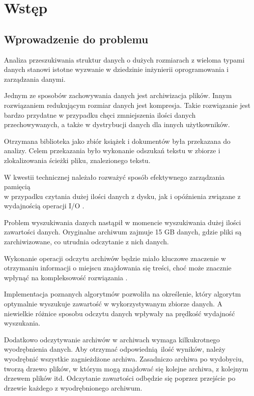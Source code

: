 \chapter{Wstęp}

\section{Wprowadzenie do problemu}
Analiza przeszukiwania struktur danych o dużych rozmiarach z wieloma typami danych stanowi
istotne wyzwanie w dziedzinie inżynierii oprogramowania i zarządzania danymi. 

Jednym ze sposobów zachowywania danych jest archiwizacja plików. Innym 
rozwiązaniem redukującym rozmiar danych jest kompresja. Takie rozwiązanie jest
bardzo przydatne w przypadku chęci
zmniejszenia ilości danych przechowywanych, a także w dystrybucji danych dla
innych użytkowników.

Otrzymana biblioteka jako zbiór książek i dokumentów była przekazana do analizy.
Celem przekazania było wykonanie odszukań tekstu w zbiorze i zlokalizowania
ścieżki pliku, znalezionego tekstu.

W kwestii technicznej należało rozważyć sposób efektywnego zarządzania pamięcią \\
w przypadku czytania dużej ilości danych z dysku, jak i opóźnienia związane z 
wydajnością operacji I/O \cite{bib:internet:UrzadzeniaWejsciaWyjscia}.

Problem wyszukiwania danych nastąpił w momencie wyszukiwania dużej ilości 
zawartości danych. Oryginalne archiwum zajmuje 15 GB danych, gdzie pliki są 
zarchiwizowane, co utrudnia odczytanie z nich danych. 

Wykonanie operacji odczytu archiwów będzie miało kluczowe znaczenie w 
otrzymaniu informacji o miejscu znajdowania się treści, choć może znacznie 
wpłynąć na kompleksowość rozwiązania \cite{bib:ksiazka:kompleksowośćArchiwów}.

Implementacja poznanych algorytmów pozwoliła na określenie, który algorytm 
optymalnie wyszukuje zawartość w wykorzystywanym zbiorze danych. A niewielkie
różnice sposobu odczytu danych wpływały na prędkość wydajność wyszukania.

Dodatkowo odczytywanie archiwów w archiwach wymaga kilkukrotnego wyodrębnienia
danych. Aby otrzymać odpowiednią ilość wyników, należy wyodrębnić 
wszystkie zagnieżdżone archiwa. Zasadniczo archiwa po wydobyciu,
tworzą drzewo plików, w którym mogą znajdować się kolejne archiwa, z kolejnym drzewem
plików itd. Odczytanie zawartości odbędzie się poprzez przejście po drzewie 
każdego z wyodrębnionego archiwum.

